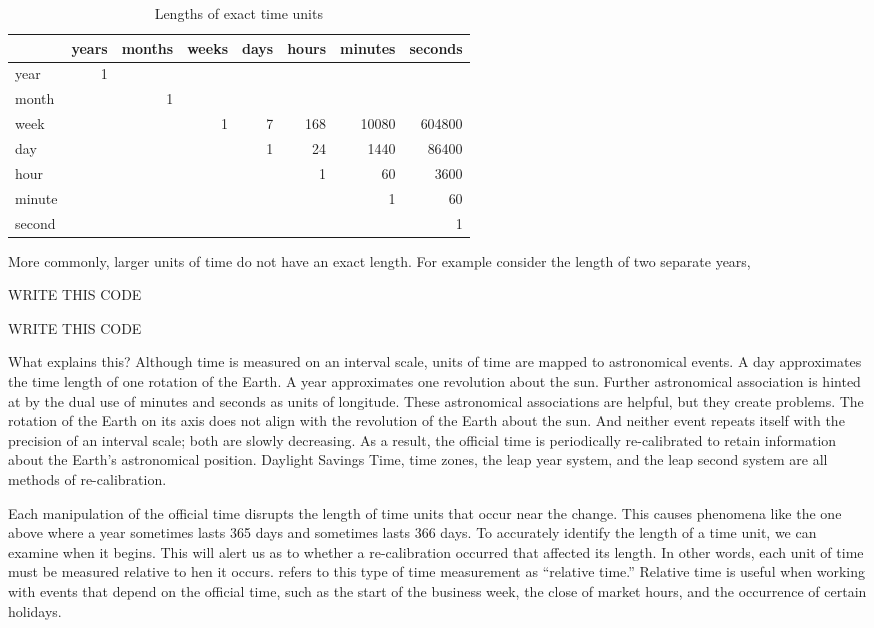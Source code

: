 \documentclass[article]{jss}
\begin{document}
\begin{table}
  \caption{Lengths of exact time units}
  \begin{center}
  \begin{tabular}{l|rrrrrrr}
  \multicolumn{1}{r}{} & years & months & weeks & days & hours & minutes & seconds\\
  \hline
  year & 1 & & & & & & \\
  month & & 1 & &&&& \\
  week  & & & 1 & 7 & 168 & 10080 & 604800 \\
  day & & & &1 & 24 & 1440 & 86400\\
  hour  & & & & & 1 & 60 & 3600\\
  minute & & & & & & 1 & 60\\
  second  & & & & & & & 1\\
  \hline
    
  \end{tabular}
  \end{center}
  \label{tbl:exact}
\end{table}


More commonly, larger units of time do not have an exact length. For example consider the length of two separate years,

 WRITE THIS CODE\\

 WRITE THIS CODE\\

What explains this? Although time is measured on an interval scale, units of time are mapped to astronomical events. A day approximates the time length of one rotation of the Earth. A year approximates one revolution about the sun.  Further astronomical association is hinted at by the dual use of minutes and seconds as units of longitude.  These astronomical associations are helpful, but they create problems. The rotation of the Earth on its axis does not align with the revolution of the Earth about the sun. And neither event repeats itself with the precision of an interval scale; both are slowly decreasing. As a result, the official time is periodically re-calibrated to retain information about the Earth's astronomical position. Daylight Savings Time, time zones, the leap year system, and the leap second system are all methods of re-calibration. 

Each manipulation of the official time disrupts the length of time units that occur near the change. This causes phenomena like the one above where a year sometimes lasts 365 days and sometimes lasts 366 days. To accurately identify the length of a time unit, we can examine when it begins. This will alert us as to whether a re-calibration occurred that affected its length. In other words, each unit of time must be measured relative to hen it occurs.  refers to this type of time measurement as ``relative time.'' Relative time is useful when working with events that depend on the official time, such as the start of the business week, the close of market hours, and the occurrence of certain holidays.
\end{document}
